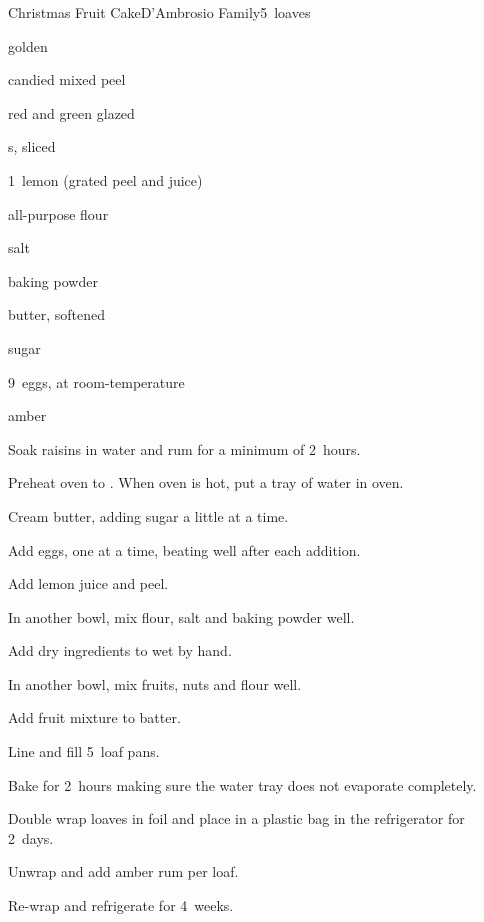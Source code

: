 \begin{recipe}{Christmas Fruit Cake}{D'Ambrosio Family}{5~loaves}

\begin{ingredients}
\item {} golden 
\item {} candied mixed peel
\item \C{1\half} red and green glazed 
\item {} s, sliced
\item 1~lemon (grated peel and juice)
\item \C{4\half} all-purpose flour
\item {} salt
\item {} baking powder
\item {} butter, softened
\item {} sugar
\item 9~eggs, at room-temperature
\item amber 
\end{ingredients}

\begin{directions}
\item Soak raisins in water and rum for a minimum of 2~hours.
\item Preheat oven to . When oven is hot, put a tray of water in oven.
\item Cream butter, adding sugar a little at a time.
\item Add eggs, one at a time, beating well after each addition.
\item Add lemon juice and peel.
\item In another bowl, mix  flour, salt and baking powder well.
\item Add dry ingredients to wet by hand.
\item In another bowl, mix fruits, nuts and \C{\half} flour well.
\item Add fruit mixture to batter.
\item Line and fill 5~loaf pans.
\item Bake for 2~hours making sure the water tray does not evaporate completely.
\item Double wrap loaves in foil and place in a plastic bag in the refrigerator for 2~days.
\item Unwrap and add \C{\third} amber rum per loaf.
\item Re-wrap and refrigerate for 4~weeks.
\end{directions}
\end{recipe}
